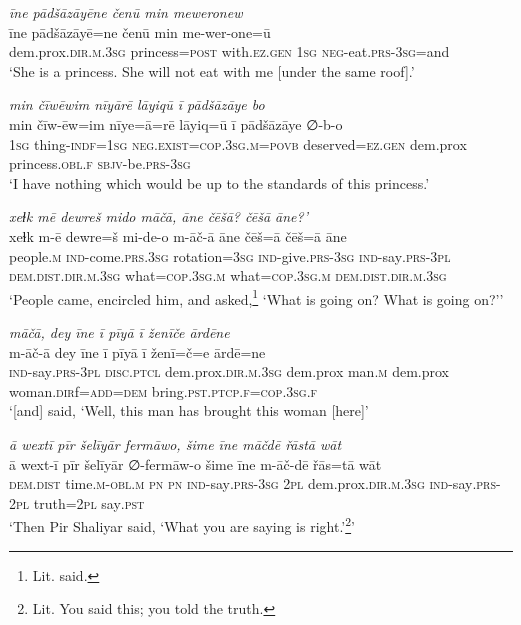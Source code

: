 \ea \label{ZP.104}
\textit{īne pādšāzāyēne čenū min meweronew} \\ 
\gll īne pādšāzāyē=ne čenū min me-wer-one=ū \\ 
 dem.prox\textsc{.dir}\textsc{.m}\textsc{.3sg} princess\textsc{=\textsc{post}} with\textsc{.ez.gen} \textsc{1sg} \textsc{neg-}eat\textsc{.prs}\textsc{-3sg}=and \\ 
\glt `She is a princess. She will not eat with me [under the same roof].'
\z 
 
\ea \label{ZP.105}
\textit{min čīwēwim nīyārē lāyiqū ī pādšāzāye bo} \\ 
\gll min čīw-ēw=im nīye=ā=rē lāyiq=ū ī pādšāzāye ∅-b-o \\ 
 \textsc{1sg} thing\textsc{-indf}\textsc{=\textsc{1sg}} \textsc{\textsc{neg.}exist}\textsc{=cop}\textsc{.3sg}\textsc{.m}\textsc{=\textsc{povb}} deserved\textsc{\textsc{=ez.gen}} dem.prox princess\textsc{.obl}\textsc{.f} \textsc{sbjv-}be\textsc{.prs}\textsc{-3sg} \\ 
\glt `I have nothing which would be up to the standards of this princess.'
\z 
 
\ea \label{ZP.113}
\textit{xeɫk mē dewreš mido māčā, āne čēšā? čēšā āne?’} \\ 
\gll xeɫk m-ē dewre=š mi-de-o m-āč-ā āne čēš=ā čēš=ā āne \\ 
 people\textsc{.m} \textsc{ind-}come\textsc{.prs}\textsc{.3sg} rotation\textsc{=3sg} \textsc{ind-}give\textsc{.prs}\textsc{-3sg} \textsc{ind-}say\textsc{.prs}\textsc{-3pl} \textsc{dem.dist}\textsc{.dir}\textsc{.m}\textsc{.3sg} what\textsc{=cop}\textsc{.3sg}\textsc{.m} what\textsc{=cop}\textsc{.3sg}\textsc{.m} \textsc{dem.dist}\textsc{.dir}\textsc{.m}\textsc{.3sg} \\ 
\glt `People came, encircled him, and asked,\footnote{Lit. said.} ‘What is going on? What is going on?’'
\z 
 
\ea \label{ZP.115}
\textit{māčā, dey īne ī pīyā ī ženīče ārdēne} \\ 
\gll m-āč-ā dey īne ī pīyā ī ženī=č=e ārdē=ne \\ 
 \textsc{ind-}say\textsc{.prs}\textsc{-3pl} \textsc{disc.ptcl} dem.prox\textsc{.dir}\textsc{.m}\textsc{.3sg} dem.prox man\textsc{.m} dem.prox woman\textsc{.dir}f\textsc{=add}\textsc{=dem} bring\textsc{.pst}\textsc{.ptcp}\textsc{.f}\textsc{=cop}\textsc{.3sg}\textsc{.f} \\ 
\glt `[and] said, ‘Well, this man has brought this woman [here]'
\z 
 
\ea \label{ZP.126}
\textit{ā wextī pīr šelīyār fermāwo, šime īne māčdē řāstā wāt} \\ 
\gll ā wext-ī pīr šelīyār ∅-fermāw-o šime īne m-āč-dē řās=tā wāt \\ 
 \textsc{dem.dist} time\textsc{.m}\textsc{-obl}\textsc{.m} \textsc{pn} \textsc{pn} \textsc{ind-}say\textsc{.prs}\textsc{-3sg} \textsc{2pl} dem.prox\textsc{.dir}\textsc{.m}\textsc{.3sg} \textsc{ind-}say\textsc{.prs}-\textsc{2pl} truth=\textsc{2pl} say\textsc{.pst} \\ 
\glt `Then Pir Shaliyar said, ‘What you are saying is right.’\footnote{Lit. You said this; you told the truth.}'
\z 
 

